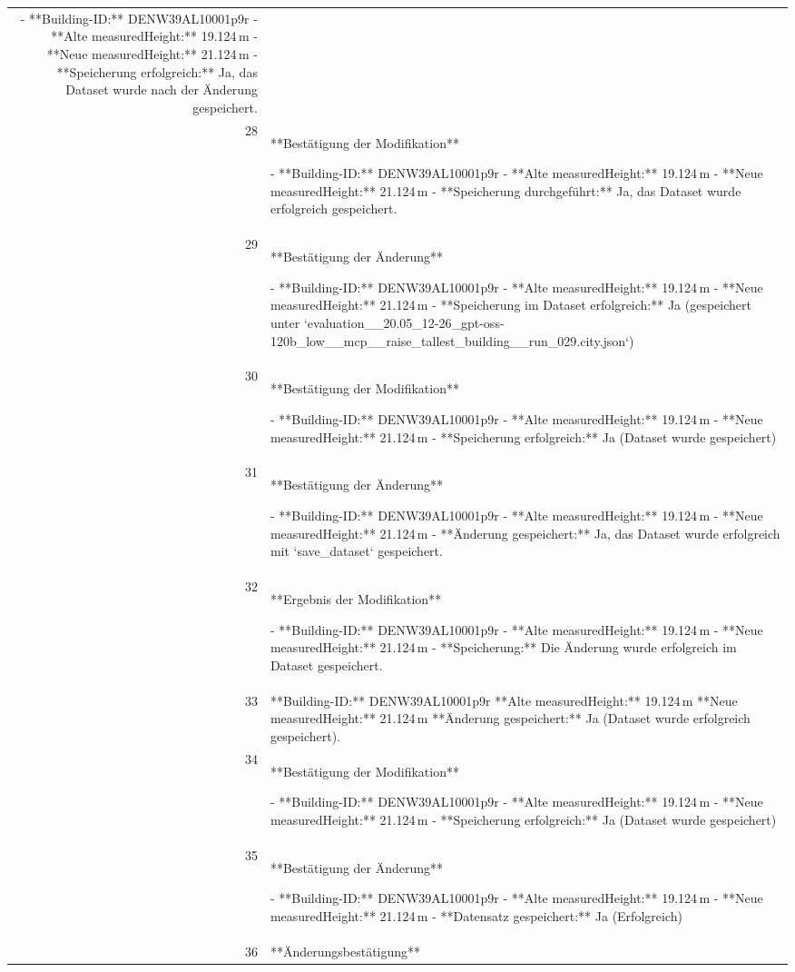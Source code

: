 \documentclass[a4paper,11pt]{article}
\begin{document}
\begin{table}[ht]
\begin{tabular}{r p{12cm}}
- **Building-ID:** DENW39AL10001p9r  
- **Alte measuredHeight:** 19.124 m  
- **Neue measuredHeight:** 21.124 m  
- **Speicherung erfolgreich:** Ja, das Dataset wurde nach der Änderung gespeichert. \\
28 & **Bestätigung der Modifikation**

- **Building-ID:** DENW39AL10001p9r  
- **Alte measuredHeight:** 19.124 m  
- **Neue measuredHeight:** 21.124 m  
- **Speicherung durchgeführt:** Ja, das Dataset wurde erfolgreich gespeichert. \\
29 & **Bestätigung der Änderung**

- **Building-ID:** DENW39AL10001p9r  
- **Alte measuredHeight:** 19.124 m  
- **Neue measuredHeight:** 21.124 m  
- **Speicherung im Dataset erfolgreich:** Ja (gespeichert unter `evaluation\_\_20.05\_12-26\_gpt-oss-120b\_low\_\_mcp\_\_raise\_tallest\_building\_\_run\_029.city.json`) \\
30 & **Bestätigung der Modifikation**

- **Building-ID:** DENW39AL10001p9r  
- **Alte measuredHeight:** 19.124 m  
- **Neue measuredHeight:** 21.124 m  
- **Speicherung erfolgreich:** Ja (Dataset wurde gespeichert) \\
31 & **Bestätigung der Änderung**

- **Building-ID:** DENW39AL10001p9r  
- **Alte measuredHeight:** 19.124 m  
- **Neue measuredHeight:** 21.124 m  
- **Änderung gespeichert:** Ja, das Dataset wurde erfolgreich mit `save\_dataset` gespeichert. \\
32 & **Ergebnis der Modifikation**

- **Building-ID:** DENW39AL10001p9r  
- **Alte measuredHeight:** 19.124 m  
- **Neue measuredHeight:** 21.124 m  
- **Speicherung:** Die Änderung wurde erfolgreich im Dataset gespeichert. \\
33 & **Building-ID:** DENW39AL10001p9r  
**Alte measuredHeight:** 19.124 m  
**Neue measuredHeight:** 21.124 m  
**Änderung gespeichert:** Ja (Dataset wurde erfolgreich gespeichert). \\
34 & **Bestätigung der Modifikation**

- **Building-ID:** DENW39AL10001p9r  
- **Alte measuredHeight:** 19.124 m  
- **Neue measuredHeight:** 21.124 m  
- **Speicherung erfolgreich:** Ja (Dataset wurde gespeichert) \\
35 & **Bestätigung der Änderung**

- **Building-ID:** DENW39AL10001p9r  
- **Alte measuredHeight:** 19.124 m  
- **Neue measuredHeight:** 21.124 m  
- **Datensatz gespeichert:** Ja (Erfolgreich) \\
36 & **Änderungsbestätigung**


\end{tabular}
\end{table}
\end{document}
